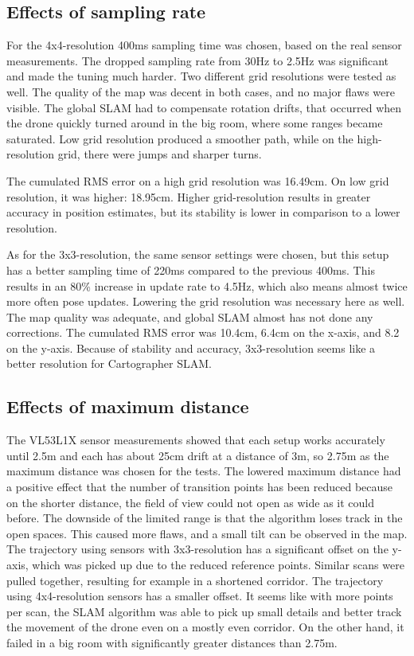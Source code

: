 \documentclass[conference]{IEEEtran}
\begin{document}




\subsection{Effects of sampling rate}

For the 4x4-resolution 400ms sampling time was chosen, based on the real sensor measurements. The dropped 
sampling rate 
from 30Hz to 2.5Hz was significant and made the tuning much harder. Two different grid resolutions were tested 
as well. The quality of the map was decent in both cases, and no major flaws were visible. The global SLAM had to 
compensate rotation drifts, that occurred when the drone quickly turned around in the big room, where some 
ranges became saturated. Low grid resolution produced a smoother path, while on the high-resolution grid, there 
were jumps and sharper turns. 

The cumulated RMS error on a high grid resolution was 16.49cm. On low grid resolution, it was higher: 18.95cm. 
Higher grid-resolution results in greater accuracy in position estimates, but its stability is lower in comparison
to a lower resolution. 

As for the 3x3-resolution, the same sensor settings were chosen, but this setup has a better sampling time of 
220ms compared to the previous 400ms. This results in an 80\% increase in update rate to 4.5Hz, which also 
means almost twice more often pose updates. Lowering the grid resolution was necessary here as well. The map 
quality was adequate, and global SLAM almost has not done any corrections. The cumulated RMS error was 10.4cm, 
6.4cm on the x-axis, and 8.2 on the y-axis. Because of stability and accuracy, 3x3-resolution seems like a 
better resolution for Cartographer SLAM. 

\subsection{Effects of maximum distance}

The VL53L1X sensor measurements showed that each setup works accurately until 2.5m and each has about 25cm 
drift at a distance of 3m, so 2.75m as the maximum distance was chosen for the tests. The lowered maximum 
distance had a positive effect that the number of transition points has been reduced because on the shorter 
distance, the field of view could not open as wide as it could before. The downside of the limited range is 
that the algorithm loses track in the open spaces. This caused more flaws, and a small tilt can be observed
in the map.  
The trajectory using sensors with 3x3-resolution has a significant offset on the y-axis, which was picked up 
due to the reduced reference points. Similar scans were pulled together, resulting for example in a shortened
corridor. 
The trajectory using 4x4-resolution sensors has a smaller offset. It seems like with more 
points per scan, the SLAM algorithm was able to pick up small details and better track the movement of the 
drone even on a mostly even corridor. On the other hand, it failed in a big room with significantly greater 
distances than 2.75m.
\end{document}
